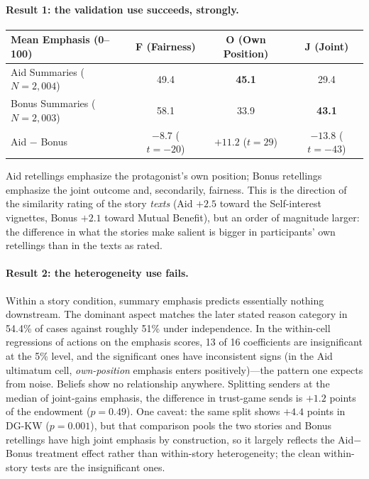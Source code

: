 \documentclass[11pt]{article}
\begin{document}
\paragraph{Result 1: the validation use succeeds, strongly.}

\begin{center}
\small
\begin{tabular}{l ccc}
\toprule
Mean Emphasis (0--100) & F (Fairness) & O (Own Position) & J (Joint) \\
\midrule
Aid Summaries ($N=2{,}004$) & 49.4 & \textbf{45.1} & 29.4 \\
Bonus Summaries ($N=2{,}003$) & 58.1 & 33.9 & \textbf{43.1} \\
Aid $-$ Bonus & $-8.7$ ($t=-20$) & $+11.2$ ($t=29$) & $-13.8$ ($t=-43$) \\
\bottomrule
\end{tabular}
\end{center}

Aid retellings emphasize the protagonist's own position; Bonus retellings emphasize the
joint outcome and, secondarily, fairness. This is the direction of the similarity rating
of the story \emph{texts} (Aid $+2.5$ toward the Self-interest vignettes, Bonus $+2.1$
toward Mutual Benefit), but an order of magnitude larger: the difference in what the
stories make salient is bigger in participants' own retellings than in the texts as
rated. 

\paragraph{Result 2: the heterogeneity use fails.} Within a story
condition, summary emphasis predicts essentially nothing downstream. The dominant
aspect matches the later stated reason category in 54.4\% of cases against roughly 51\%
under independence. In the within-cell regressions of actions on the emphasis scores,
13 of 16 coefficients are insignificant at the 5\% level, and the significant ones have
inconsistent signs (in the Aid ultimatum cell, \emph{own-position} emphasis enters
positively)---the pattern one expects from noise. Beliefs show no relationship anywhere.
Splitting senders at the median of joint-gains emphasis,
the difference in trust-game sends is $+1.2$ points of the endowment ($p=0.49$). One
caveat: the same split shows $+4.4$ points in DG-KW ($p=0.001$), but
that comparison pools the two stories and Bonus retellings have high joint emphasis by
construction, so it largely reflects the Aid$-$Bonus treatment effect rather than
within-story heterogeneity; the clean within-story tests are the insignificant ones. 
\end{document}
